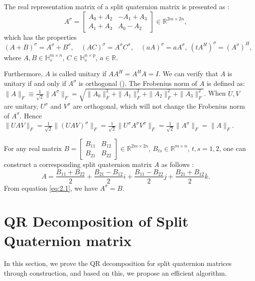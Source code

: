 \documentclass[5p,10pt]{elsarticle}
\numberwithin{equation}{section}
\begin{document}
The real representation matrix of a split quaternion matrix is presented as \cite{Gang2024}:
\begin{equation}\label{eq:2.1}
{A}^\sigma = \begin{bmatrix} A_0 + A_2 & -A_1 + A_3 \\ A_1 + A_3 & A_0 - A_2 \end{bmatrix} \in \mathbb{R}^{2m \times 2n},
\end{equation}
which has the properties
\begin{equation}\label{eq:2.2}
    (A + B)^\sigma = A^\sigma + B^\sigma, \quad (AC)^\sigma = A^\sigma C^\sigma, \quad (a A)^\sigma = a A^\sigma, \ (tA^H)^\sigma = (A^\sigma)^H,
\end{equation}
where $A, B \in \mathbb{H}_s^{m \times n}$, $C \in \mathbb{H}_s^{n \times p}$, $a \in \mathbb{R}$.

Furthermore,  $A$ is called unitary if $AA^H = A^H A = I$. We can verify that $A$ is unitary if and only if  $A^\sigma$ is  orthogonal (\cite{TJiang2018}).
 The Frobenius norm of $A$ is defined as: $ \| A \|_F \equiv \frac{1}{\sqrt{2}} \| A^\sigma \|_F = \sqrt{\| A_0 \|_F^2 + \| A_1 \|_F^2 + \| A_2 \|_F^2 + \| A_3 \|_F^2}.$ When $U, V$ are unitary, $U^\sigma$ and $V^\sigma$ are orthogonal, which will not change the Frobenius norm  of $A^\sigma$. Hence
$\|UAV\|_F = \frac{1}{\sqrt{2}} \|(UAV)^\sigma\|_F 
= \frac{1}{\sqrt{2}} \|U^\sigma A^\sigma V^\sigma\|_F
=\frac{1}{\sqrt{2}} \|A^\sigma\|_F
= \|A\|_F.$

For any real matrix $B = \begin{bmatrix} B_{11} & B_{12} \\ B_{21} & B_{22} \end{bmatrix} \in \mathbb{R}^{2m \times 2n}$, $B_{ts} \in \mathbb{R}^{m \times n}$, $t, s = 1, 2$, one can construct a corresponding split quaternion matrix $A$ as follows \cite{TJiang2015}:
\begin{equation}\label{eq:2.3}
{A} = \frac{B_{11} + B_{22}}{2} + \frac{B_{21} - B_{12}}{2}i + \frac{B_{11} - B_{22}}{2}j + \frac{B_{21} + B_{12}}{2}k.
\end{equation}
From equation \eqref{eq:2.1}, we have ${A}^\sigma = B$. 

\section{QR Decomposition of Split Quaternion matrix}
In this section, we prove the QR decomposition for split quaternion matrices through construction, and based on this, we propose an efficient algorithm.
\end{document}
